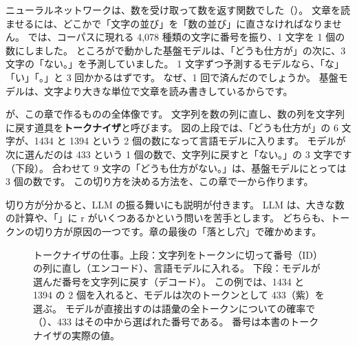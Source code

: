 ニューラルネットワークは、数を受け取って数を返す関数でした（）。
文章を読ませるには、どこかで「文字の並び」を「数の並び」に直さなければなりません。
では、コーパスに現れる 4,078 種類の文字に番号を振り、1 文字を 1 個の数にしました。
ところがで動かした基盤モデルは、「どうも仕方が」の次に、3 文字の「ない。」を予測していました。
1 文字ずつ予測するモデルなら、「な」「い」「。」と 3 回かかるはずです。
なぜ、1 回で済んだのでしょうか。
基盤モデルは、文字より大きな単位で文章を読み書きしているからです。

が、この章で作るものの全体像です。
文字列を数の列に直し、数の列を文字列に戻す道具を\textbf{トークナイザ}と呼びます。
図の上段では、「どうも仕方が」の 6 文字が、1434 と 1394 という 2 個の数になって言語モデルに入ります。
モデルが次に選んだのは 433 という 1 個の数で、文字列に戻すと「ない。」の 3 文字です（下段）。
合わせて 9 文字の「どうも仕方がない。」は、基盤モデルにとっては 3 個の数です。
この切り方を決める方法を、この章で一から作ります。

切り方が分かると、LLM の振る舞いにも説明が付きます。
LLM は、大きな数の計算や、「」に r がいくつあるかという問いを苦手とします。
どちらも、トークンの切り方が原因の一つです。章の最後の「落とし穴」で確かめます。

\begin{figure}[tbp]
\centering
{}
\caption{トークナイザの仕事。上段：文字列をトークンに切って番号（ID）の列に直し（エンコード）、言語モデルに入れる。
下段：モデルが選んだ番号を文字列に戻す（デコード）。
この例では、1434 と 1394 の 2 個を入れると、モデルは次のトークンとして 433（紫）を選ぶ。
モデルが直接出すのは語彙の全トークンについての確率で（）、433 はその中から選ばれた番号である。
番号は本書のトークナイザの実際の値。}
\label{fig:tok-pipeline}
\end{figure}

